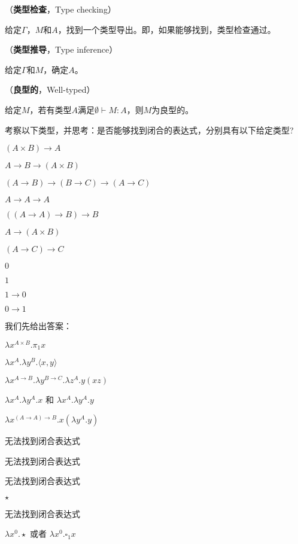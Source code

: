 \begin{defn}（\textbf{类型检查}，Type checking）

给定$\Gamma$，$M$和$A$，找到一个类型导出。即，如果能够找到，类型检查通过。

\end{defn}

\begin{defn}（\textbf{类型推导}，Type inference）

给定$\Gamma$和$M$，确定$A$。

\end{defn}

\begin{defn}（\textbf{良型的}，Well-typed）

给定$M$，若有类型$A$满足$\emptyset \vdash M : A$，则$M$为良型的。

\end{defn}

\begin{exmp}
考察以下类型，并思考：是否能够找到闭合的表达式，分别具有以下给定类型?

\begin{tightenum}

  \item $( A \times B) \to A$
  \item $A \to B \to (A \times B)$
  \item $(A \to B) \to (B \to C) \to (A \to C)$
  \item $A \to A \to A$
  \item $((A \to A) \to B) \to B$
  \item $A \to (A \times B)$
  \item $(A \to C) \to C$
  \item $0$
  \item $1$
  \item $1 \to 0$
  \item $0 \to 1$
\end{tightenum}

我们先给出答案：
\begin{tightenum}
  \item $\lambda x^{A \times B}.\pi_1 x$
  \item $\lambda x^A . \lambda y^B . \langle x, y \rangle$
  \item $\lambda x^{A \to B}. \lambda y^{B \to C} . \lambda z^A . y(xz)$
  \item $\lambda x^A . \lambda y^A . x$ 和 $\lambda x^A . \lambda y^A . y$
  \item $\lambda x^{(A \to A) \to B} . x(\lambda y^A . y)$
  \item 无法找到闭合表达式
  \item 无法找到闭合表达式
  \item 无法找到闭合表达式
  \item $\star$
  \item 无法找到闭合表达式
  \item $\lambda x^{0}. \star$ 或者 $\lambda x^{0}. \square_{1} x$
\end{tightenum}
\end{exmp}

